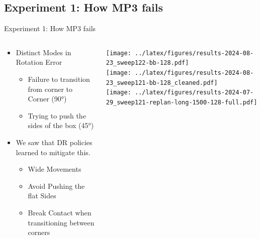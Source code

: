 \documentclass[16:9,en,navbarinfooter]{sdqbeamer}
\begin{document}
\subsection{Experiment 1: How MP3 fails}
\begin{frame}{Experiment 1: How MP3 fails}

	\begin{columns}[t]
		\begin{column}{0.5\textwidth}
			\vspace{1cm}
			\begin{itemize}
				\item Distinct Modes in Rotation Error
				      \begin{itemize}
					      \item Failure to transition from corner to Corner (90°)
					      \item Trying to push the sides of the box (45°)
				      \end{itemize}
				\item We saw that DR policies learned to mitigate this.
				      \begin{itemize}
					      \item Wide Movements
					      \item Avoid Pushing the flat Sides
					      \item Break Contact when transitioning between corners
				      \end{itemize}
			\end{itemize}
		\end{column}
		\begin{column}{0.5\textwidth}
			\vspace{1cm}
			\texttt{[image: ../latex/figures/results-2024-08-23\_sweep122-bb-128.pdf]} \\
			\texttt{[image: ../latex/figures/results-2024-08-23\_sweep121-bb-128\_cleaned.pdf]}\\
			\texttt{[image: ../latex/figures/results-2024-07-29\_sweep121-replan-long-1500-128-full.pdf]}\\
		\end{column}
	\end{columns}
\end{frame}
\end{document}
